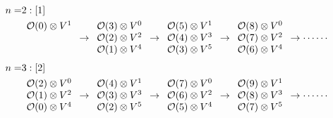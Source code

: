 \begin{equation}
\begin{split}
n=&2:[1]\\&
\begin{array}{c}
\calo(0)\otimes V^1\\
\phantom{\calo}
\\
\phantom{\calo}
\end{array}
\to
\begin{array}{c}
\calo(3)\otimes V^0\\
\calo(2)\otimes V^2\\
\calo(1)\otimes V^4\\
\end{array}
\to
\begin{array}{c}
\calo(5)\otimes V^1\\
\calo(4)\otimes V^3 \\
\calo(3)\otimes V^5 
\end{array}
\to
\begin{array}{c}
\calo(8)\otimes V^0\\
\calo(7)\otimes V^2\\
\calo(6)\otimes V^4\\
\end{array}
\to
\cdots\cdots 
\end{split}
\end{equation}
\begin{equation}
\eqlabel{neq3}
\begin{split}
n=&3:[2]\\&
\begin{array}{c}
\calo(2)\otimes V^0\\
\calo(1)\otimes V^2\\
\calo(0)\otimes V^4\\
\end{array}
\to
\begin{array}{c}
\calo(4)\otimes V^1\\
\calo(3)\otimes V^3 \\
\calo(2)\otimes V^5 
\end{array}
\to
\begin{array}{c}
\calo(7)\otimes V^0\\
\calo(6)\otimes V^2\\
\calo(5)\otimes V^4\\
\end{array}
\to
\begin{array}{c}
\calo(9)\otimes V^1\\
\calo(8)\otimes V^3 \\
\calo(7)\otimes V^5 
\end{array}
\to \cdots\cdots\\
\end{split}
\end{equation}
